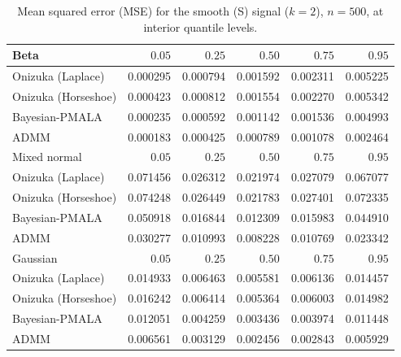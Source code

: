 \begin{table}[!htbp]
\centering
\small
\caption{Mean squared error (MSE) for the smooth (S) signal ($k=2$), $n=500$, at interior quantile levels.}
\label{tab:s_int_mse}
\begin{tabular}{lrrrrr}
\toprule
Beta & $0.05$ & $0.25$ & $0.50$ & $0.75$ & $0.95$ \\
\midrule
Onizuka (Laplace) & 0.000295 & 0.000794 & 0.001592 & 0.002311 & 0.005225 \\
Onizuka (Horseshoe) & 0.000423 & 0.000812 & 0.001554 & 0.002270 & 0.005342 \\
Bayesian-PMALA & 0.000235 & 0.000592 & 0.001142 & 0.001536 & 0.004993 \\
ADMM & 0.000183 & 0.000425 & 0.000789 & 0.001078 & 0.002464 \\
\midrule
Mixed normal & $0.05$ & $0.25$ & $0.50$ & $0.75$ & $0.95$ \\
\midrule
Onizuka (Laplace) & 0.071456 & 0.026312 & 0.021974 & 0.027079 & 0.067077 \\
Onizuka (Horseshoe) & 0.074248 & 0.026449 & 0.021783 & 0.027401 & 0.072335 \\
Bayesian-PMALA & 0.050918 & 0.016844 & 0.012309 & 0.015983 & 0.044910 \\
ADMM & 0.030277 & 0.010993 & 0.008228 & 0.010769 & 0.023342 \\
\midrule
Gaussian & $0.05$ & $0.25$ & $0.50$ & $0.75$ & $0.95$ \\
\midrule
Onizuka (Laplace) & 0.014933 & 0.006463 & 0.005581 & 0.006136 & 0.014457 \\
Onizuka (Horseshoe) & 0.016242 & 0.006414 & 0.005364 & 0.006003 & 0.014982 \\
Bayesian-PMALA & 0.012051 & 0.004259 & 0.003436 & 0.003974 & 0.011448 \\
ADMM & 0.006561 & 0.003129 & 0.002456 & 0.002843 & 0.005929 \\
\bottomrule
\end{tabular}
\end{table}
